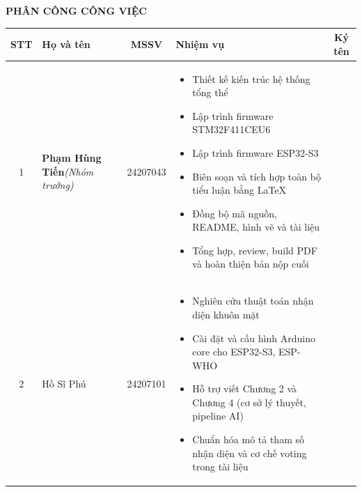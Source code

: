 \thispagestyle{plain}
\begin{singlespace}

\begin{center}
  {\Large\bfseries PHÂN CÔNG CÔNG VIỆC}
\end{center}

\vspace{0.5cm}

\begin{center}
\footnotesize
\setlength{\tabcolsep}{3pt}
\setlength{\extrarowheight}{2pt}
\begin{tabular}{c >{\raggedright\arraybackslash}p{3.2cm} c >{\raggedright\arraybackslash}p{7.0cm} c}
  \toprule
  \textbf{STT} & \textbf{Họ và tên} & \textbf{MSSV} & \textbf{Nhiệm vụ} & \textbf{Ký tên} \\
  \midrule

  1 &
  \textbf{Phạm Hùng Tiến}\newline\textit{(Nhóm trưởng)} &
  24207043 &
  \vspace{-8pt}\begin{itemize}[leftmargin=1em, topsep=0pt, itemsep=0pt, parsep=0pt]
    \item Thiết kế kiến trúc hệ thống tổng thể
    \item Lập trình firmware STM32F411CEU6
    \item Lập trình firmware ESP32-S3
    \item Biên soạn và tích hợp toàn bộ tiểu luận bằng LaTeX
    \item Đồng bộ mã nguồn, README, hình vẽ và tài liệu
    \item Tổng hợp, review, build PDF và hoàn thiện bản nộp cuối
  \end{itemize}\vspace{-4pt} &
  \\

  \midrule

  2 &
  Hồ Sĩ Phú &
  24207101 &
  \vspace{-8pt}\begin{itemize}[leftmargin=1em, topsep=0pt, itemsep=0pt, parsep=0pt]
    \item Nghiên cứu thuật toán nhận diện khuôn mặt
    \item Cài đặt và cấu hình Arduino core cho ESP32-S3, ESP-WHO
    \item Hỗ trợ viết Chương 2 và Chương 4 (cơ sở lý thuyết, pipeline AI)
    \item Chuẩn hóa mô tả tham số nhận diện và cơ chế voting trong tài liệu
  \end{itemize}\vspace{-4pt} &
  \\


\end{tabular}
\end{center}
\end{singlespace}
